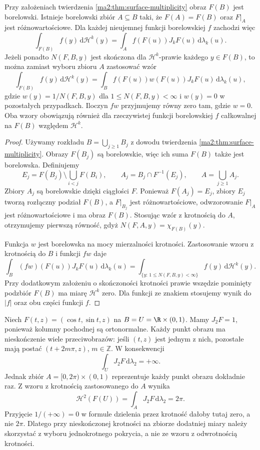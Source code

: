 \begin{wniosek}
\label{ma2:cor:surface-remove-multiplicity}
Przy założeniach twierdzenia
\ref{ma2:thm:surface-multiplicity} obraz $F(B)$
jest borelowski. Istnieje borelowski zbiór
$A\subseteq B$ taki, że $F(A)=F(B)$ oraz
$F|_A$ jest różnowartościowe. Dla każdej
nieujemnej funkcji borelowskiej $f$ zachodzi więc
\[
 \int_{F(B)}f(y)\,\mathrm d\mathcal H^k(y)
 =\int_A f(F(u))J_kF(u)\,\mathrm d\lambda_k(u).
\]
Jeżeli ponadto $N(F,B,y)$ jest skończona
dla $\mathcal H^k$-prawie każdego $y\in F(B)$,
to można zamiast wyboru zbioru $A$ zastosować wzór
\[
 \int_{F(B)}f(y)\,\mathrm d\mathcal H^k(y)
 =\int_B f(F(u))w(F(u))J_kF(u)\,
       \mathrm d\lambda_k(u),
\]
gdzie $w(y)=1/N(F,B,y)$ dla
$1\le N(F,B,y)<\infty$ i $w(y)=0$
w pozostałych przypadkach. Iloczyn $fw$
przyjmujemy równy zero tam, gdzie $w=0$.
Oba wzory obowiązują również dla rzeczywistej
funkcji borelowskiej $f$ całkowalnej na $F(B)$
względem $\mathcal H^k$.
\end{wniosek}
\begin{proof}
Używamy rozkładu $B=\bigcup_{j\ge1}B_j$
z dowodu twierdzenia
\ref{ma2:thm:surface-multiplicity}.
Obrazy $F(B_j)$ są borelowskie, więc ich suma
$F(B)$ także jest borelowska. Definiujemy
\[
 E_j=F(B_j)\setminus\bigcup_{i<j}F(B_i),
 \qquad
 A_j=B_j\cap F^{-1}(E_j),\qquad
 A=\bigcup_{j\ge1}A_j.
\]
Zbiory $A_j$ są borelowskie dzięki ciągłości $F$.
Ponieważ $F(A_j)=E_j$, zbiory $E_j$ tworzą
rozłączny podział $F(B)$, a $F|_{B_j}$ jest
różnowartościowe, odwzorowanie $F|_A$
jest różnowartościowe i ma obraz $F(B)$.
Stosując wzór z krotnością do $A$, otrzymujemy
pierwszą równość, gdyż
$N(F,A,y)=\chi_{F(B)}(y)$.

Funkcja $w$ jest borelowska na mocy
mierzalności krotności. Zastosowanie wzoru
z krotnością do $B$ i funkcji $fw$ daje
\[
 \int_B (fw)(F(u))J_kF(u)\,\mathrm d\lambda_k(u)
 =\int_{\{y:\,1\le N(F,B,y)<\infty\}}
        f(y)\,\mathrm d\mathcal H^k(y).
\]
Przy dodatkowym założeniu o skończoności
krotności prawie wszędzie pominięty podzbiór
$F(B)$ ma miarę $\mathcal H^k$ zero.
Dla funkcji ze znakiem stosujemy wynik
do $|f|$ oraz obu części funkcji $f$.
\end{proof}

\begin{przyklad}
\label{ma2:ex:surface-infinite-multiplicity}
Niech $F(t,z)=(\cos t,\sin t,z)$ na
$B=U=\R\times(0,1)$.
Mamy $J_2F=1$, ponieważ kolumny pochodnej
są ortonormalne. Każdy punkt obrazu ma
nieskończenie wiele przeciwobrazów:
jeśli $(t,z)$ jest jednym z nich, pozostałe
mają postać $(t+2m\pi,z)$, $m\in\mathbb Z$.
W konsekwencji
\[
 \int_U J_2F\,\mathrm d\lambda_2=+\infty.
\]
Jednak zbiór $A=[0,2\pi)\times(0,1)$
reprezentuje każdy punkt obrazu dokładnie raz.
Z wzoru z krotnością zastosowanego do $A$ wynika
\[
 \mathcal H^2(F(U))
 =\int_A J_2F\,\mathrm d\lambda_2=2\pi.
\]
Przyjęcie $1/(+\infty)=0$ w formule
dzielenia przez krotność dałoby tutaj zero,
a nie $2\pi$. Dlatego przy nieskończonej
krotności na zbiorze dodatniej miary należy
skorzystać z wyboru jednokrotnego pokrycia,
a nie ze wzoru z odwrotnością krotności.
\end{przyklad}

